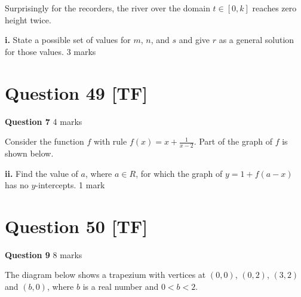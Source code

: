 \documentclass[10pt,a4paper]{article}
\begin{document}
Surprisingly for the recorders, the river over the domain $t \in [0,k]$ reaches zero height twice.

\textbf{i.} State a possible set of values for $m$, $n$, and $s$ and give $r$ as a general solution for those values. \hfill 3 marks

\vspace{9\baselineskip}

\hrulefill

\section*{Question 49 [TF]}

\textbf{Question 7} \hfill 4 marks

Consider the function $f$ with rule $f(x) = x + \frac{1}{x-2}$. Part of the graph of $f$ is shown below.

\begin{center}
\end{center}

\textbf{ii.} Find the value of $a$, where $a \in R$, for which the graph of $y = 1 + f(a-x)$ has no $y$-intercepts. \hfill 1 mark

\vspace{9\baselineskip}

\hrulefill

\section*{Question 50 [TF]}

\textbf{Question 9} \hfill 8 marks

The diagram below shows a trapezium with vertices at $(0,0)$, $(0,2)$, $(3,2)$ and $(b,0)$, where $b$ is a real number and $0 < b < 2$.
\end{document}
